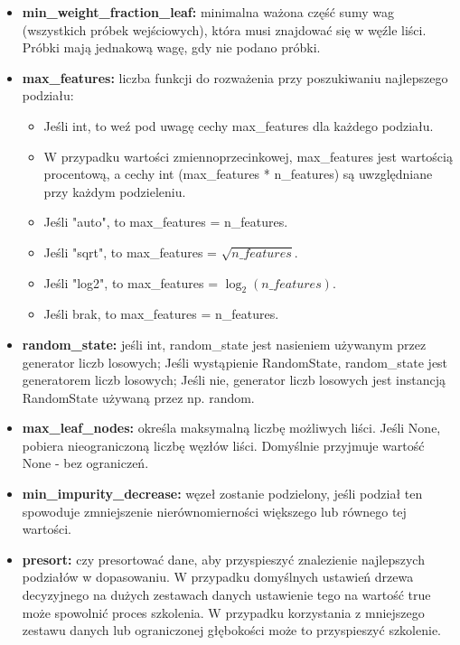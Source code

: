 \documentclass[10pt,a4paper]{article}
\begin{document}
\begin{itemize}
	\item \textbf{min\_weight\_fraction\_leaf:} minimalna ważona część sumy wag (wszystkich próbek wejściowych), która musi znajdować się w węźle liści. Próbki mają jednakową wagę, gdy nie podano próbki.
	\item \textbf{max\_features:} liczba funkcji do rozważenia przy poszukiwaniu najlepszego podziału:
	\begin{itemize}
		\item Jeśli int, to weź pod uwagę cechy max\_features dla każdego podziału.
		\item W przypadku wartości zmiennoprzecinkowej, max\_features jest wartością procentową, a cechy int (max\_features * n\_features) są uwzględniane przy każdym podzieleniu.
		\item Jeśli "auto", to max\_features = n\_features.
		\item Jeśli "sqrt", to max\_features = $\sqrt{n\_features}$.
		\item Jeśli "log2", to max\_features = $\log_2{(n\_features)}$.
		\item Jeśli brak, to max\_features = n\_features.
\end{itemize}

	\item \textbf{random\_state:} jeśli int, random\_state jest nasieniem używanym przez generator liczb losowych; Jeśli wystąpienie RandomState, random\_state jest generatorem liczb losowych; Jeśli nie, generator liczb losowych jest instancją RandomState używaną przez np. random.
	\item \textbf{max\_leaf\_nodes:} określa maksymalną liczbę możliwych liści. Jeśli None, pobiera nieograniczoną liczbę węzłów liści. Domyślnie przyjmuje wartość None - bez ograniczeń.
	\item \textbf{min\_impurity\_decrease:} węzeł zostanie podzielony, jeśli podział ten spowoduje zmniejszenie nierównomierności większego lub równego tej wartości.
	\item \textbf{presort:} czy presortować dane, aby przyspieszyć znalezienie najlepszych podziałów w dopasowaniu. W przypadku domyślnych ustawień drzewa decyzyjnego na dużych zestawach danych ustawienie tego na wartość true może spowolnić proces szkolenia. W przypadku korzystania z mniejszego zestawu danych lub ograniczonej głębokości może to przyspieszyć szkolenie.
\end{itemize}
\vskip 0.2in
\end{document}
